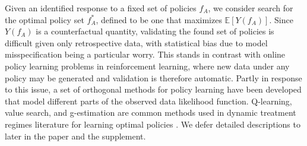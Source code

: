 \documentclass{article}
\newcommand{\E}{\mathbb{E}}
\begin{document}
Given an identified response to a fixed set of policies $f_A$, we consider search for the optimal policy set $f^*_A$, defined to be one that maximizes $\E[Y(f_A)]$.
Since $Y(f_A)$ is a counterfactual quantity, validating the found set of policies is difficult given only retrospective data, with statistical bias due to model misspecification being a particular worry.  This stands in contrast with online policy learning problems in reinforcement learning, where new data under any policy may be generated and validation is therefore automatic. Partly in response to this issue, a set of orthogonal methods for policy learning have been developed that model different parts of the observed data likelihood function.
Q-learning, value search, and g-estimation are common methods used in dynamic treatment regimes literature for learning optimal policies \cite{Moodie13DTR}. We defer detailed descriptions to later in the paper and the supplement.
\end{document}
